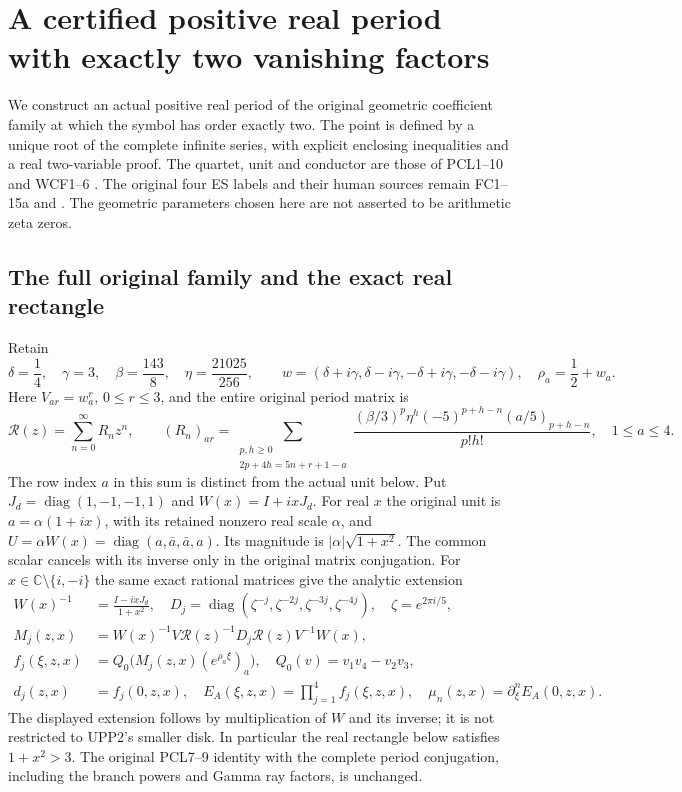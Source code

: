 \section{A certified positive real period with exactly two vanishing factors}
\label{sec:real-pair-zero}
We construct an actual positive real period of the original geometric
coefficient family at which the symbol has order exactly two. The
point is defined by a unique root of the complete infinite series,
with explicit enclosing inequalities and a real two-variable proof.
The quartet, unit and conductor are those of PCL1--10 and WCF1--6
\cite{PCLOriginal,WCF}. The original four ES labels and their human
sources remain FC1--15a and \cite{ES488}. The geometric parameters
chosen here are not asserted to be arithmetic zeta zeros.

\subsection{The full original family and the exact real rectangle}
Retain
\[
 \delta=\frac14,\quad\gamma=3,\quad\beta=\frac{143}{8},
 \quad\eta=\frac{21025}{256},\qquad
 w=(\delta+i\gamma,\delta-i\gamma,-\delta+i\gamma,-\delta-i\gamma),
 \quad \rho_a=\frac12+w_a .\tag{RPZ1}
\]
Here $V_{ar}=w_a^r$, $0\le r\le3$, and the entire original period
matrix is
\[
 \mathcal R(z)=\sum_{n=0}^{\infty}R_nz^n,\qquad
 (R_n)_{ar}=\sum_{\substack{p,h\ge0\\2p+4h=5n+r+1-a}}
 \frac{(\beta/3)^p\eta^h(-5)^{p+h-n}(a/5)_{p+h-n}}{p!h!},
 \quad 1\le a\le4.\tag{RPZ2}
\]
The row index $a$ in this sum is distinct from the actual unit below.
Put $J_d=\operatorname{diag}(1,-1,-1,1)$ and $W(x)=I+ixJ_d$.
For real $x$ the original unit is $a=\alpha(1+ix)$, with its retained
nonzero real scale $\alpha$, and
$U=\alpha W(x)=\operatorname{diag}(a,\bar a,\bar a,a)$.
Its magnitude is $|\alpha|\sqrt{1+x^2}$. The common scalar cancels
with its inverse only in the original matrix conjugation.
For $x\in\mathbb C\setminus\{i,-i\}$ the same exact rational
matrices give the analytic extension
\[
 \begin{aligned}
 W(x)^{-1}&=\frac{I-ixJ_d}{1+x^2},\quad
 D_j=\operatorname{diag}(\zeta^{-j},\zeta^{-2j},\zeta^{-3j},\zeta^{-4j}),
 \quad\zeta=e^{2\pi i/5},\\
 M_j(z,x)&=W(x)^{-1}V\mathcal R(z)^{-1}D_j\mathcal R(z)V^{-1}W(x),\\
 f_j(\xi,z,x)&=Q_0\bigl(M_j(z,x)(e^{\rho_a\xi})_a\bigr),
 \quad Q_0(v)=v_1v_4-v_2v_3,\\
 d_j(z,x)&=f_j(0,z,x),\quad
 E_A(\xi,z,x)=\prod_{j=1}^4 f_j(\xi,z,x),\quad
 \mu_n(z,x)=\partial_\xi^n E_A(0,z,x).
 \end{aligned}\tag{RPZ3}
\]
The displayed extension follows by multiplication of $W$ and its
inverse; it is not restricted to UPP2's smaller disk. In particular
the real rectangle below satisfies $1+x^2>3$. The original PCL7--9
identity with the complete period conjugation, including the branch
powers and Gamma ray factors, is unchanged.

